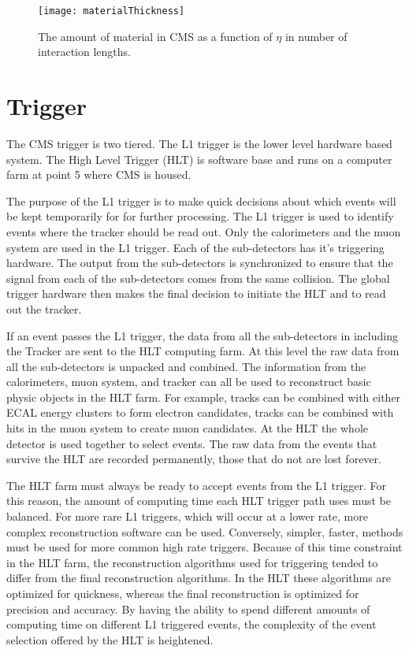     \begin{figure}[!Hhbt]
      \centering
      \texttt{[image: materialThickness]}
      \caption{The amount of material in CMS as a function of $\eta$ in 
        number of interaction lengths.}
      \label{fig:matThick}
    \end{figure}
 
  \section{Trigger}
    The CMS trigger is two tiered. 
    The L1 trigger is the lower level hardware based system. 
    The High Level Trigger (HLT) is software base and runs on a computer farm
      at point 5 where CMS is housed.

    The purpose of the L1 trigger is to make quick decisions about which events
      will be kept temporarily for for further processing.
    The L1 trigger is used to identify events where the tracker should be read
      out.
    Only the calorimeters and the muon system are used in the L1 trigger.
    Each of the sub-detectors has it's triggering hardware.
    The output from the sub-detectors is synchronized to ensure that the signal
      from each of the sub-detectors comes from the same collision. 
    The global trigger hardware then makes the final decision to initiate the 
      HLT and to read out the tracker. 

    If an event passes the L1 trigger, the data from all the sub-detectors in
      including the Tracker are sent to the HLT computing farm. 
    At this level the raw data from all the sub-detectors is unpacked and 
      combined.
    The information from the calorimeters, muon system, and tracker can all 
      be used to reconstruct basic physic objects in the HLT farm. 
    For example, tracks can be combined with either ECAL energy clusters to 
      form electron candidates, tracks can be combined with hits in the muon
      system to create muon candidates.
    At the HLT the whole detector is used together to select events.
    The raw data from the events that survive the HLT are recorded permanently,
      those that do not are lost forever. 

    The HLT farm must always be ready to accept events from the L1 trigger.
    For this reason, the amount of computing time each HLT trigger path uses
      must be balanced.
    For more rare L1 triggers, which will occur at a lower rate, more 
      complex reconstruction software can be used.
    Conversely, simpler, faster, methods must be used for more common high
      rate triggers. 
    Because of this time constraint in the HLT farm, the reconstruction 
      algorithms used for triggering tended to differ from the final 
      reconstruction algorithms.
    In the HLT these algorithms are optimized for quickness, whereas the final 
      reconstruction is optimized for precision and accuracy.
    By having the ability to spend different amounts of computing time on 
      different L1 triggered events, the complexity of the event selection 
      offered by the HLT is heightened. 

